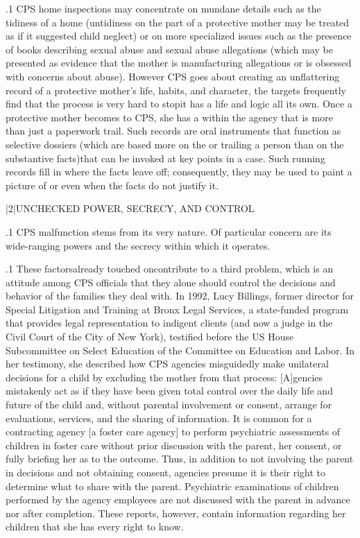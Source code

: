 \documentclass[11pt, twoside]{article}
\begin{document}
{\p.1{%
CPS home inspections may concentrate on mundane details such as
the tidiness of a home (untidiness on the part of a protective mother
may be treated as if it suggested child neglect) or on more specialized
issues such as the presence of books describing sexual abuse and sexual
abuse allegations (which may be presented as evidence that the mother
is manufacturing allegations or is obsessed with concerns about abuse).
However CPS goes about creating an unflattering record of a protective mother's life, habits, and character, the targets frequently find that
the process is very hard to stop\mdash{}it has a life and logic all its own. Once
a protective mother becomes  to CPS, she has a  within
the agency that is more than just a paperwork trail. Such records are
\mdash{}oral instruments that function as selective dossiers
(which are based more on the  or  trailing a person than
on the substantive facts)\mdash{}that can be invoked at key points in a case.
Such running records fill in where the facts leave off; consequently, they
may be used to paint a picture of  or  even when the
facts do not justify it.
}%


\s|2|{UNCHECKED POWER, SECRECY, AND CONTROL}

\p.1{%
\noindent{}CPS malfunction stems from its very nature. Of particular concern are
its wide-ranging powers and the secrecy within which it operates.
}%

\p.1{%
These factors\mdash{}already touched on\mdash{}contribute to a third problem, which is an attitude among CPS officials that they alone should
control the decisions and behavior of the families they deal with. In
1992, Lucy Billings, former director for Special Litigation and Training
at Bronx Legal Services, a state-funded program that provides legal representation to indigent clients (and now a judge in the Civil Court of
the City of New York), testified before the US House Subcommittee on
Select Education of the Committee on Education and Labor. In her testimony, she described how CPS agencies misguidedly make unilateral
decisions for a child by excluding the mother from that process:
[A]gencies mistakenly act as if they have been given total control
over the daily life and future of the child and, without parental
involvement or consent, arrange for evaluations, services, and the
sharing of information. It is common for a contracting agency [a
foster care agency] to perform psychiatric assessments of children
in foster care without prior discussion with the parent, her consent, or fully briefing her as to the outcome. Thus, in addition to
not involving the parent in decisions and not obtaining consent,
agencies presume it is their right to determine what to share with
the parent. Psychiatric examinations of children performed by the
agency employees are not discussed with the parent in advance
nor after completion. These reports, however, contain information
regarding her children that she has every right to know.
}%

}
\end{document}
